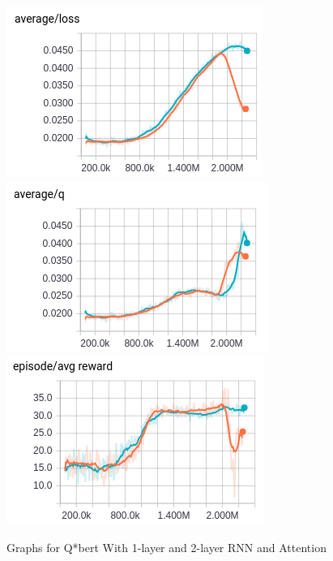 \documentclass{article}
\begin{document}
\begin{figure}[h]
    \centering
    \begin{minipage}{1.0\textwidth}
        \centering
        \includegraphics[scale=0.4]{attention-avg_loss}
        \centering
        \includegraphics[scale=0.4]{attention-avg_q}
        \centering
        \includegraphics[scale=0.4]{attention-episode_avg_reward}
    \end{minipage}
    \caption{Graphs for Q*bert With 1-layer and 2-layer RNN and Attention}
\end{figure}
\end{document}

